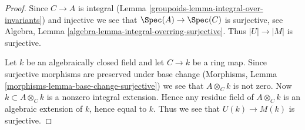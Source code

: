 \begin{proof}

Since $C \to A$ is integral (Lemma \ref{groupoids-lemma-integral-over-invariants})
and injective we see that $\Spec(A) \to \Spec(C)$ is surjective, see
Algebra, Lemma \ref{algebra-lemma-integral-overring-surjective}.
Thus $|U| \to |M|$ is surjective.

\medskip\noindent
Let $k$ be an algebraically closed field and let $C \to k$ be a ring map.
Since surjective morphisms are preserved under base change
(Morphisms, Lemma \ref{morphisms-lemma-base-change-surjective})
we see that $A \otimes_C k$ is not zero. Now $k \subset A \otimes_C k$ is a
nonzero integral extension. Hence any residue field of $A \otimes_C k$
is an algebraic extension of $k$, hence equal to $k$. Thus we see that
$U(k) \to M(k)$ is surjective.


\end{proof}
